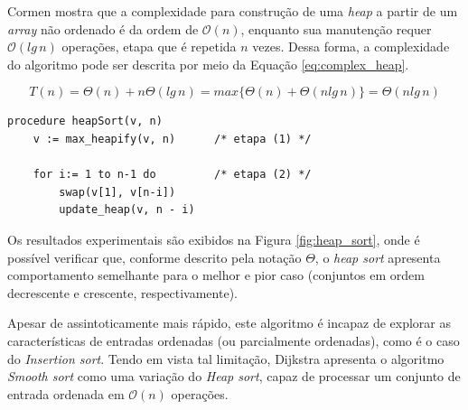 \documentclass[12pt]{article}
\begin{document}
Cormen \cite{cormen_algorithms_ptbr} mostra que a complexidade para construção de uma \textit{heap} a partir de um \textit{array} não ordenado é da ordem de $\mathcal{O}(n)$, enquanto sua manutenção requer $\mathcal{O}(lg\,n)$ operações, etapa que é repetida $n$ vezes. Dessa forma, a complexidade do algoritmo pode ser descrita por meio da Equação \ref{eq:complex_heap}.

\begin{equation}
    \label{eq:complex_heap}
    T(n) = \Theta(n) + n\Theta(lg\,n) = max\{\Theta(n) + \Theta(nlg\,n)\} = \Theta(nlg\,n)
\end{equation}

\begin{lstlisting}[caption=Descrição do \textit{heap sort}, float, label=alg:heapsort_hl, captionpos=b]
procedure heapSort(v, n)
    v := max_heapify(v, n)      /* etapa (1) */
    
    for i:= 1 to n-1 do         /* etapa (2) */
        swap(v[1], v[n-i])
        update_heap(v, n - i)
\end{lstlisting}

Os resultados experimentais são exibidos na Figura \ref{fig:heap_sort}, onde é possível verificar que, conforme descrito pela notação $\Theta$, o \textit{heap sort} apresenta comportamento semelhante para o melhor e pior caso (conjuntos em ordem decrescente e crescente, respectivamente).

Apesar de assintoticamente mais rápido, este algoritmo é incapaz de explorar as características de entradas ordenadas (ou parcialmente ordenadas), como é o caso do \textit{Insertion sort}. Tendo em vista tal limitação, Dijkstra \cite{smoothsort} apresenta o algoritmo \textit{Smooth sort} como uma variação do \textit{Heap sort}, capaz de processar um conjunto de entrada ordenada em $\mathcal{O}(n)$ operações.
\end{document}
